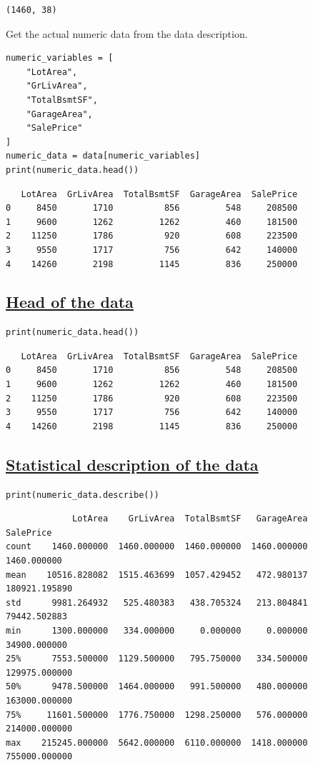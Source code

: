 \documentclass[11pt]{article}
\begin{document}
\label{org0eb7fbd}
\begin{verbatim}
(1460, 38)
\end{verbatim}


Get the actual numeric data from the data description.
\begin{verbatim}
numeric_variables = [
    "LotArea",
    "GrLivArea",
    "TotalBsmtSF",
    "GarageArea",
    "SalePrice"
]
numeric_data = data[numeric_variables]
print(numeric_data.head())
\end{verbatim}

\label{orgbe092ab}
\begin{verbatim}
   LotArea  GrLivArea  TotalBsmtSF  GarageArea  SalePrice
0     8450       1710          856         548     208500
1     9600       1262         1262         460     181500
2    11250       1786          920         608     223500
3     9550       1717          756         642     140000
4    14260       2198         1145         836     250000
\end{verbatim}
\subsection{\href{https://pandas.pydata.org/docs/reference/api/pandas.DataFrame.head.html}{Head of the data}}
\label{sec:orge9a73bd}
\begin{verbatim}
print(numeric_data.head())
\end{verbatim}

\label{org2ff291c}
\begin{verbatim}
   LotArea  GrLivArea  TotalBsmtSF  GarageArea  SalePrice
0     8450       1710          856         548     208500
1     9600       1262         1262         460     181500
2    11250       1786          920         608     223500
3     9550       1717          756         642     140000
4    14260       2198         1145         836     250000
\end{verbatim}
\subsection{\href{https://pandas.pydata.org/docs/reference/api/pandas.DataFrame.describe.html}{Statistical description of the data}}
\label{sec:org6244640}
\begin{verbatim}
print(numeric_data.describe())
\end{verbatim}

\label{orgeb4eb36}
\begin{verbatim}
             LotArea    GrLivArea  TotalBsmtSF   GarageArea      SalePrice
count    1460.000000  1460.000000  1460.000000  1460.000000    1460.000000
mean    10516.828082  1515.463699  1057.429452   472.980137  180921.195890
std      9981.264932   525.480383   438.705324   213.804841   79442.502883
min      1300.000000   334.000000     0.000000     0.000000   34900.000000
25%      7553.500000  1129.500000   795.750000   334.500000  129975.000000
50%      9478.500000  1464.000000   991.500000   480.000000  163000.000000
75%     11601.500000  1776.750000  1298.250000   576.000000  214000.000000
max    215245.000000  5642.000000  6110.000000  1418.000000  755000.000000
\end{verbatim}
\end{document}
